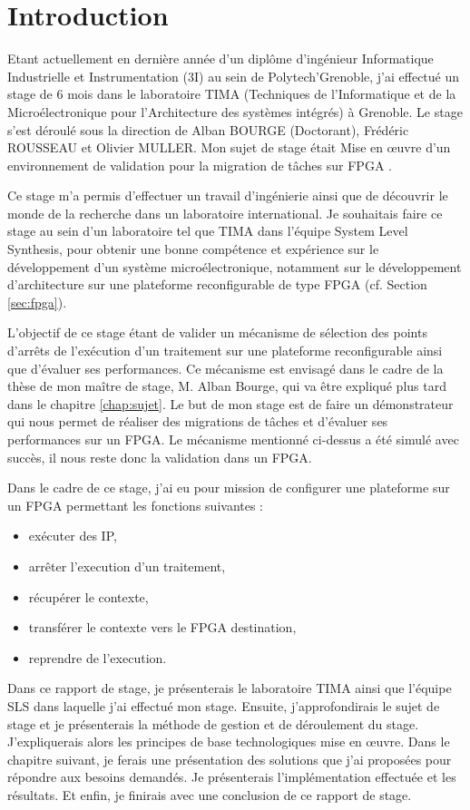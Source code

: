 \chapter{Introduction}
\label{chap:intro}
\OnehalfSpacing
\setlength{\parindent}{2em}
Etant actuellement en dernière année d'un diplôme d'ingénieur Informatique Industrielle et Instrumentation (3I) au sein de Polytech'Grenoble, 
j'ai effectué un stage de 6 mois dans le laboratoire TIMA (Techniques de l'Informatique et de la Microélectronique 
pour l'Architecture des systèmes intégrés) à Grenoble. 
Le stage s'est déroulé sous la direction de Alban BOURGE (Doctorant), Frédéric ROUSSEAU et Olivier MULLER. 
Mon sujet de stage était \og Mise en œuvre d'un environnement de validation pour la migration de tâches sur FPGA \fg.

Ce stage m'a permis d'effectuer un travail d'ingénierie ainsi que de découvrir le monde de la recherche
dans un laboratoire international. Je souhaitais faire ce stage au sein d'un laboratoire tel que TIMA dans l'équipe System Level Synthesis, pour obtenir une bonne compétence et expérience sur le développement d'un système microélectronique, notamment sur le développement d'architecture sur une plateforme reconfigurable de type FPGA (cf. Section \ref{sec:fpga}). 

L'objectif de ce stage étant de valider un mécanisme de sélection des points d'arrêts de l'exécution d'un traitement sur une plateforme reconfigurable ainsi que d'évaluer ses performances. 
Ce mécanisme est envisagé dans le cadre de la thèse de mon maître de stage, M. Alban Bourge, qui va être expliqué plus tard dans le chapitre \ref{chap:sujet}. 
Le but de mon stage est de faire un démonstrateur qui nous permet de réaliser des migrations de tâches et d'évaluer ses performances sur un FPGA.
Le mécanisme mentionné ci-dessus a été simulé avec succès, il nous reste donc la validation dans un FPGA. 

Dans le cadre de ce stage, j'ai eu pour mission de configurer une plateforme sur un FPGA permettant les fonctions suivantes :
\begin{itemize}
\item exécuter des IP,
\item arrêter l'execution d'un traitement,
\item récupérer le contexte,
\item transférer le contexte vers le FPGA destination,
\item reprendre de l'execution.
\end{itemize}

Dans ce rapport de stage, je présenterais le laboratoire TIMA ainsi que l'équipe SLS dans laquelle j'ai effectué mon stage. Ensuite, j'approfondirais le sujet de stage et je
présenterais la méthode de gestion et de déroulement du stage. J'expliquerais alors les principes de base technologiques mise en œuvre. Dans le chapitre suivant, je ferais une présentation des solutions
que j'ai proposées pour répondre aux besoins demandés. Je présenterais l'implémentation effectuée et les résultats.
Et enfin, je finirais avec une conclusion de ce rapport de stage.